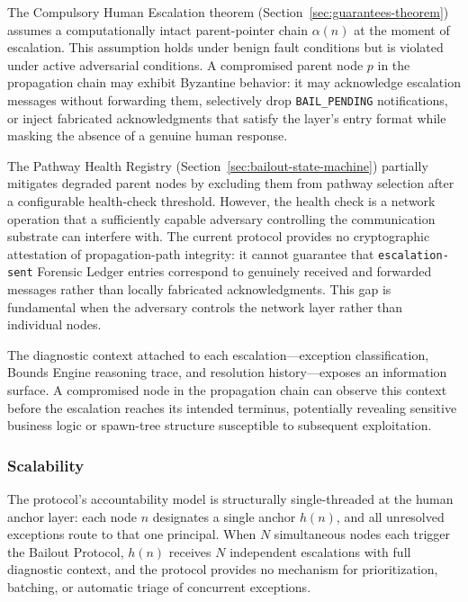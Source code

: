 The Compulsory Human Escalation theorem (Section~\ref{sec:guarantees-theorem}) assumes a computationally intact parent-pointer chain $\alpha(n)$ at the moment of escalation. This assumption holds under benign fault conditions but is violated under active adversarial conditions. A compromised parent node $p$ in the propagation chain may exhibit Byzantine behavior: it may acknowledge escalation messages without forwarding them, selectively drop \texttt{BAIL\_PENDING} notifications, or inject fabricated acknowledgments that satisfy the \fact{} layer's entry format while masking the absence of a genuine human response.

The Pathway Health Registry (Section~\ref{sec:bailout-state-machine}) partially mitigates degraded parent nodes by excluding them from pathway selection after a configurable health-check threshold. However, the health check is a network operation that a sufficiently capable adversary controlling the communication substrate can interfere with. The current protocol provides no cryptographic attestation of propagation-path integrity: it cannot guarantee that \texttt{escalation-sent} Forensic Ledger entries correspond to genuinely received and forwarded messages rather than locally fabricated acknowledgments. This gap is fundamental when the adversary controls the network layer rather than individual nodes.

The diagnostic context attached to each escalation---exception classification, Bounds Engine reasoning trace, and resolution history---exposes an information surface. A compromised node in the propagation chain can observe this context before the escalation reaches its intended terminus, potentially revealing sensitive business logic or spawn-tree structure susceptible to subsequent exploitation.

\subsubsection{Scalability}
\label{sec:lim:scalability}

The protocol's accountability model is structurally single-threaded at the human anchor layer: each node $n$ designates a single anchor $h(n)$, and all unresolved exceptions route to that one principal. When $N$ simultaneous nodes each trigger the Bailout Protocol, $h(n)$ receives $N$ independent escalations with full diagnostic context, and the protocol provides no mechanism for prioritization, batching, or automatic triage of concurrent exceptions.

